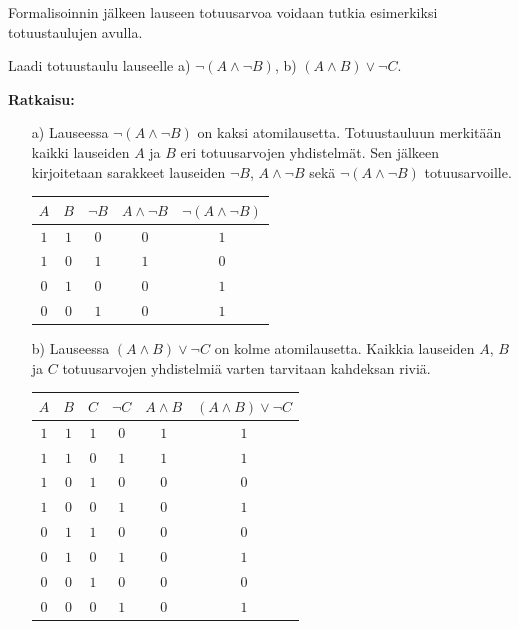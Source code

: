Formalisoinnin jälkeen lauseen totuusarvoa voidaan tutkia esimerkiksi totuustaulujen avulla.

\begin{esimerkki}
Laadi totuustaulu lauseelle a) $\lnot(A\land \lnot B)$, b) $(A\land B)\lor \lnot C$.

{\bf Ratkaisu:}
\begin{itemize}
\item[a)] Lauseessa $\lnot(A\land \lnot B)$ on kaksi atomilausetta. Totuustauluun merkitään kaikki lauseiden $A$ ja $B$ eri totuusarvojen yhdistelmät. Sen jälkeen kirjoitetaan sarakkeet lauseiden $\lnot B$, $A\land \lnot B$ sekä $\lnot(A\land \lnot B)$  totuusarvoille.
\bigskip

\begin{center}
\begin{tabular}{|c|c|c|c|c|}\hline
$A$ & $B$ & $\lnot B$ & $A\land \lnot B$ & $\lnot(A\land \lnot B)$ \\ \hline
$1$ & $1$ & $0$       & $0$ & $1$ \\ 
$1$ & $0$ & $1$       & $1$ & $0$ \\
$0$ & $1$ & $0$       & $0$ & $1$ \\
$0$ & $0$ & $1$       & $0$ & $1$ \\ \hline
\end{tabular}
\end{center}

\bigskip

\item[b)] Lauseessa $(A\land B)\lor \lnot C$ on kolme atomilausetta. Kaikkia lauseiden $A$, $B$ ja $C$ totuusarvojen yhdistelmiä varten tarvitaan kahdeksan riviä.

\bigskip

\begin{center}
\begin{tabular}{|c|c|c|c|c|c|}\hline
$A$ & $B$ & $C$ & $\lnot C$ & $A\land B$ & $(A\land B)\lor \lnot C$\\ \hline
$1$ & $1$ & $1$ & $0$ & $1$ & $1$ \\ %
$1$ & $1$ & $0$ & $1$ & $1$ & $1$ \\
$1$ & $0$ & $1$ & $0$ & $0$ & $0$ \\
$1$ & $0$ & $0$ & $1$ & $0$ & $1$ \\
$0$ & $1$ & $1$ & $0$ & $0$ & $0$ \\
$0$ & $1$ & $0$ & $1$ & $0$ & $1$ \\
$0$ & $0$ & $1$ & $0$ & $0$ & $0$ \\
$0$ & $0$ & $0$ & $1$ & $0$ & $1$ \\ \hline
\end{tabular}
\end{center}

\end{itemize}
\end{esimerkki}


